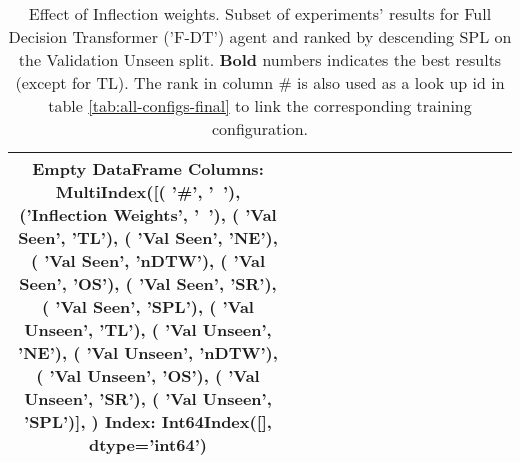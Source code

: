 \begin{table}
\centering
\caption{\label{tab:f_dt_inflection_weights}Effect of Inflection weights. Subset of experiments' results for Full Decision Transformer ('F-DT') agent and ranked by descending SPL on the Validation Unseen split. \textbf{Bold} numbers indicates the best results (except for TL). The rank in column \# is also used as a look up id in table \ref{tab:all-configs-final} to link the corresponding training configuration.}
\begin{tabular}{@{\hskip3pt}c@{\hskip3pt}c@{\hskip3pt}c@{\hskip3pt}c@{\hskip3pt}c@{\hskip3pt}c@{\hskip3pt}c@{\hskip3pt}c@{\hskip3pt}c@{\hskip3pt}c@{\hskip3pt}c@{\hskip3pt}c@{\hskip3pt}c@{\hskip3pt}c@{\hskip3pt}c}
\toprule
Empty DataFrame
Columns: MultiIndex([(                '\textbf{\#}',    '\textbf{~}'),
            ('\textbf{Inflection Weights}',    '\textbf{~}'),
            (          '\textbf{Val Seen}',   '\textbf{TL}'),
            (          '\textbf{Val Seen}',   '\textbf{NE}'),
            (          '\textbf{Val Seen}', '\textbf{nDTW}'),
            (          '\textbf{Val Seen}',   '\textbf{OS}'),
            (          '\textbf{Val Seen}',   '\textbf{SR}'),
            (          '\textbf{Val Seen}',  '\textbf{SPL}'),
            (        '\textbf{Val Unseen}',   '\textbf{TL}'),
            (        '\textbf{Val Unseen}',   '\textbf{NE}'),
            (        '\textbf{Val Unseen}', '\textbf{nDTW}'),
            (        '\textbf{Val Unseen}',   '\textbf{OS}'),
            (        '\textbf{Val Unseen}',   '\textbf{SR}'),
            (        '\textbf{Val Unseen}',  '\textbf{SPL}')],
           )
Index: Int64Index([], dtype='int64') \\
\bottomrule
\end{tabular}
\end{table}
